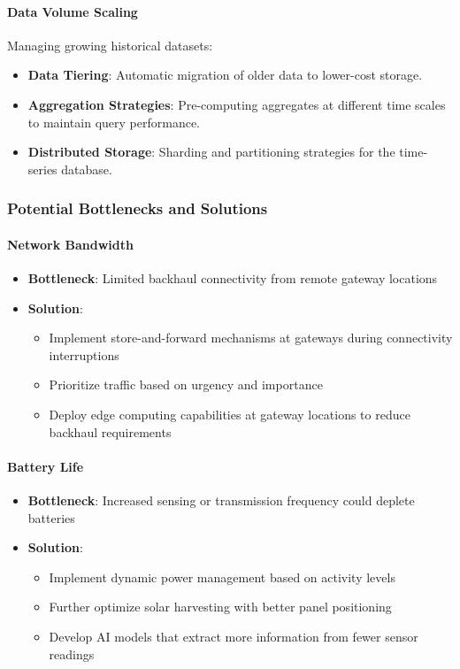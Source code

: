 \paragraph{Data Volume Scaling}
Managing growing historical datasets:

\begin{itemize}
  \item \textbf{Data Tiering}: Automatic migration of older data to lower-cost storage.
  \item \textbf{Aggregation Strategies}: Pre-computing aggregates at different time scales to maintain query performance.
  \item \textbf{Distributed Storage}: Sharding and partitioning strategies for the time-series database.
\end{itemize}

\subsubsection{Potential Bottlenecks and Solutions}

\paragraph{Network Bandwidth}
\begin{itemize}
  \item \textbf{Bottleneck}: Limited backhaul connectivity from remote gateway locations
  \item \textbf{Solution}: 
    \begin{itemize}
      \item Implement store-and-forward mechanisms at gateways during connectivity interruptions
      \item Prioritize traffic based on urgency and importance
      \item Deploy edge computing capabilities at gateway locations to reduce backhaul requirements
    \end{itemize}
\end{itemize}

\paragraph{Battery Life}
\begin{itemize}
  \item \textbf{Bottleneck}: Increased sensing or transmission frequency could deplete batteries
  \item \textbf{Solution}:
    \begin{itemize}
      \item Implement dynamic power management based on activity levels
      \item Further optimize solar harvesting with better panel positioning
      \item Develop AI models that extract more information from fewer sensor readings
    \end{itemize}
\end{itemize}

